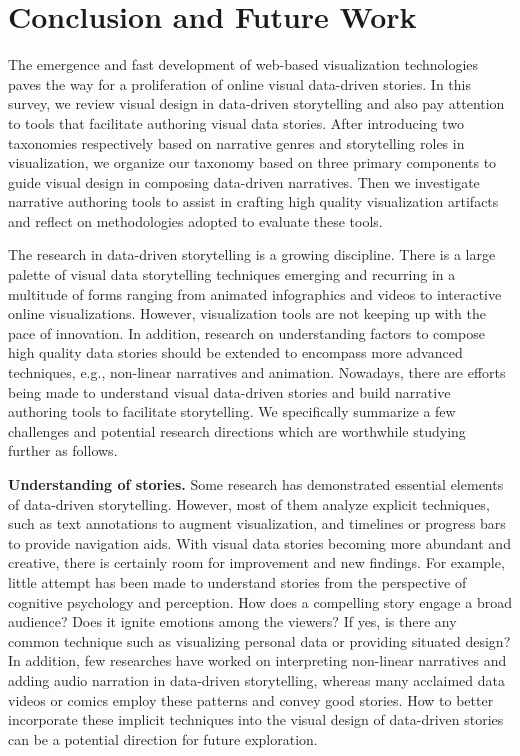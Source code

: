 \chapter{Conclusion and Future Work}\label{sec-conclusion}
The emergence and fast development of web-based visualization technologies paves the way for a proliferation of online visual data-driven stories. In this survey, we review visual design in data-driven storytelling and also pay attention to tools that facilitate authoring visual data stories. After introducing two taxonomies respectively based on narrative genres and storytelling roles in visualization, we organize our taxonomy based on three primary components to guide visual design in composing data-driven narratives. Then we investigate narrative authoring tools to assist in crafting high quality visualization artifacts and reflect on methodologies adopted to evaluate these tools.


The research in data-driven storytelling is a growing discipline. There is a large palette of visual data storytelling techniques emerging and recurring in a multitude of forms ranging from animated infographics and videos to interactive online visualizations. However, visualization tools are not keeping up with the pace of innovation. In addition, research on understanding factors to compose high quality data stories should be extended to encompass more advanced techniques, e.g., non-linear narratives and animation. Nowadays, there are efforts being made to understand visual data-driven stories and build narrative authoring tools to facilitate storytelling. We specifically summarize a few challenges and potential research directions which are worthwhile studying further as follows.


\textbf{Understanding of stories.} Some research has demonstrated essential elements of data-driven storytelling. However, most of them analyze explicit techniques, such as text annotations to augment visualization, and timelines or progress bars to provide navigation aids. With visual data stories becoming more abundant and creative, there is certainly room for improvement and new findings. For example, little attempt has been made to understand stories from the perspective of cognitive psychology and perception. How does a compelling story engage a broad audience? Does it ignite emotions among the viewers? If yes, is there any common technique such as visualizing personal data or providing situated design? In addition, few researches have worked on interpreting non-linear narratives and adding audio narration  in data-driven storytelling, whereas many acclaimed data videos or comics \cite{inequality, Bach2018} employ these patterns and convey good stories. How to better incorporate these implicit techniques into the visual design of data-driven stories can be a potential direction for future exploration. 


